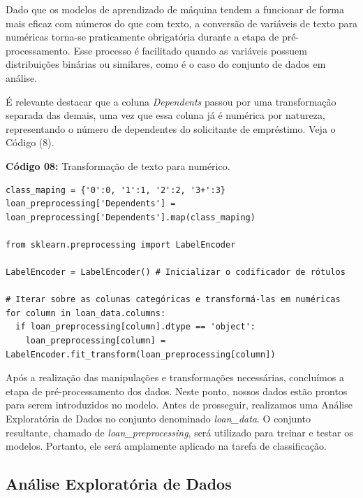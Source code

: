\documentclass[a4paper,12pt]{article} %
\begin{document}
Dado que os modelos de aprendizado de máquina tendem a funcionar de forma mais eficaz com números do que com texto, a conversão de variáveis de texto para numéricas torna-se praticamente obrigatória durante a etapa de pré-processamento. Esse processo é facilitado quando as variáveis possuem distribuições binárias ou similares, como é o caso do conjunto de dados em análise.

É relevante destacar que a coluna \textit{Dependents} passou por uma transformação separada das demais, uma vez que essa coluna já é numérica por natureza, representando o número de dependentes do solicitante de empréstimo. Veja o Código (8).
\begin{center}
\textbf{Código 08:} Transformação de texto para numérico.
\begin{verbatim}
class_maping = {'0':0, '1':1, '2':2, '3+':3}
loan_preprocessing['Dependents'] = loan_preprocessing['Dependents'].map(class_maping)

from sklearn.preprocessing import LabelEncoder

LabelEncoder = LabelEncoder() # Inicializar o codificador de rótulos

# Iterar sobre as colunas categóricas e transformá-las em numéricas
for column in loan_data.columns:
  if loan_preprocessing[column].dtype == 'object':
    loan_preprocessing[column] = LabelEncoder.fit_transform(loan_preprocessing[column])
\end{verbatim}
\end{center}

Após a realização das manipulações e transformações necessárias, concluímos a etapa de pré-processamento dos dados. Neste ponto, nossos dados estão prontos para serem introduzidos no modelo. Antes de prosseguir, realizamos uma Análise Exploratória de Dados no conjunto denominado \textit{loan\_data}. O conjunto resultante, chamado de \textit{loan\_preprocessing}, será utilizado para treinar e testar os modelos. Portanto, ele será amplamente aplicado na tarefa de classificação.

\subsection{Análise Exploratória de Dados}
\end{document}
